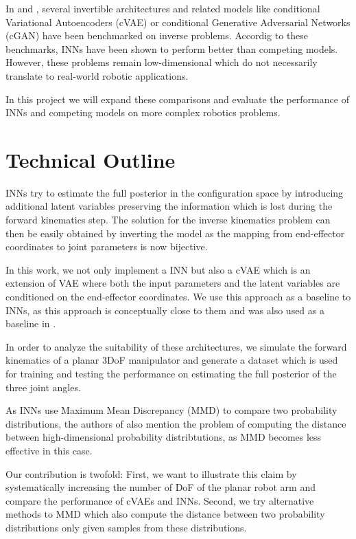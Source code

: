 \documentclass[conference]{IEEEtran}
\begin{document}
In \cite{Kruse2019} and \cite{Ardizzone2018}, several invertible architectures and related models like conditional Variational Autoencoders (cVAE) \cite{Sohn2015} or conditional Generative Adversarial Networks (cGAN) \cite{Mehdi2018} have been benchmarked on inverse problems. Accordig to these benchmarks, INNs have been shown to perform better than competing models. However, these problems remain low-dimensional which do not necessarily translate to real-world robotic applications.

In this project we will expand these comparisons and evaluate the performance of INNs and competing models on more complex robotics problems.

\section*{Technical Outline}

INNs try to estimate the full posterior in the configuration space by introducing additional latent variables preserving the information which is lost during the forward kinematics step. The solution for the inverse kinematics problem can then be easily obtained by inverting the model as the mapping from end-effector coordinates to joint parameters is now bijective.

In this work, we not only implement a INN but also a cVAE which is an extension of VAE where both the input parameters and the latent variables are conditioned on the end-effector coordinates. We use this approach as a baseline to INNs, as this approach is conceptually close to them and was also used as a baseline in \cite{Ardizzone2018}.

In order to analyze the suitability of these architectures, we simulate the forward kinematics of a planar 3DoF manipulator and generate a dataset which is used for training and testing the performance on estimating the full posterior of the three joint angles.

As INNs use Maximum Mean Discrepancy (MMD) \cite{Gretton2008} to compare two probability distributions, the authors of \cite{Ardizzone2018} also mention the problem of computing the distance between high-dimensional probability distribtutions, as MMD becomes less effective in this case.

Our contribution is twofold: First, we want to illustrate this claim by systematically increasing the number of DoF of the planar robot arm and compare the performance of cVAEs and INNs. Second, we try alternative methods to MMD which also compute the distance between two probability distributions only given samples from these distributions.



\end{document}
